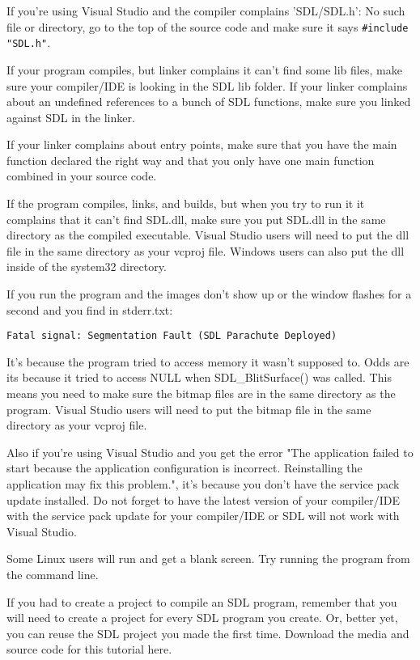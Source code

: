 If you're using Visual Studio and the compiler complains 'SDL/SDL.h': No such
file or directory, go to the top of the source code and make sure it says
\verb|#include "SDL.h"|.

If your program compiles, but linker complains it can't find some lib files,
make sure your compiler/IDE is looking in the SDL lib folder. If your linker
complains about an undefined references to a bunch of SDL functions, make sure
you linked against SDL in the linker.

If your linker complains about entry points, make sure that you have the main
function declared the right way and that you only have one main function
combined in your source code.

If the program compiles, links, and builds, but when you try to run it it
complains that it can't find SDL.dll, make sure you put SDL.dll in the same
directory as the compiled executable. Visual Studio users will need to put the
dll file in the same directory as your vcproj file. Windows users can also put
the dll inside of the system32 directory.

If you run the program and the images don't show up or the window flashes for a
second and you find in stderr.txt:

\begin{verbatim}
Fatal signal: Segmentation Fault (SDL Parachute Deployed)
\end{verbatim}

It's because the program tried to access memory it wasn't supposed to. Odds are
its because it tried to access NULL when SDL\_BlitSurface() was called. This
means you need to make sure the bitmap files are in the same directory as the
program. Visual Studio users will need to put the bitmap file in the same
directory as your vcproj file.

Also if you're using Visual Studio and you get the error "The application failed
to start because the application configuration is incorrect. Reinstalling the
application may fix this problem.", it's because you don't have the service pack
update installed. Do not forget to have the latest version of your compiler/IDE
with the service pack update for your compiler/IDE or SDL will not work with
Visual Studio.

Some Linux users will run and get a blank screen. Try running the program from
the command line.

If you had to create a project to compile an SDL program, remember that you will
need to create a project for every SDL program you create. Or, better yet, you
can reuse the SDL project you made the first time.
Download the media and source code for this tutorial here.

\secup
